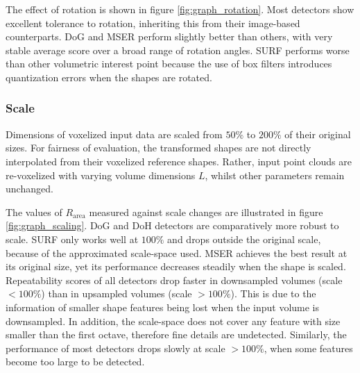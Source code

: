 The effect of rotation is shown in figure \ref{fig:graph_rotation}. Most detectors show excellent tolerance to rotation, inheriting this from their image-based counterparts. 
DoG and MSER perform slightly better than others, with very stable average score over a broad range of rotation angles. SURF performs worse than other volumetric interest point because the use of box filters introduces quantization errors when the shapes are rotated.

\subsubsection{Scale}

Dimensions of voxelized input data are scaled from $50\%$ to $200\%$ of their original sizes. For fairness of evaluation, the transformed shapes are not directly interpolated from their voxelized reference shapes. Rather, input point clouds are re-voxelized with varying volume dimensions $L$, whilst other parameters remain unchanged. 

The values of $R_{\textrm{area}}$ measured against scale changes are illustrated in figure \ref{fig:graph_scaling}. DoG and DoH detectors are comparatively more robust to scale. SURF only works well at $100\%$ and drops outside the original scale, because of the approximated scale-space used. MSER achieves the best result at its original size, yet its performance decreases steadily when the shape is scaled.
Repeatability scores of all detectors drop faster in downsampled volumes (scale $< 100\%$) than in upsampled volumes (scale $> 100\%$). 
This is due to the information of smaller shape features being lost when the input volume is downsampled. In addition, the scale-space does not cover any feature with size smaller than the first octave, therefore fine details are undetected.  
Similarly, the performance of most detectors drops slowly at scale $> 100\%$, when some features become too large to be detected. 

